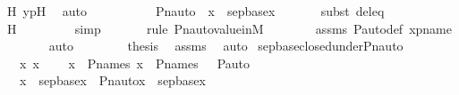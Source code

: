 \begin{isabellebody}
\ H\ ypH\ \isamarkupfalse%
\ auto\isanewline
\ \ \ \ \isamarkupfalse%
\isanewline
\isanewline
\ \ \ \ \isamarkupfalse%
\ {\isachardoublequoteopen}Pn{\isacharunderscore}{\kern0pt}auto{\isacharparenleft}{\kern0pt}{\isasympi}{\isacharparenright}{\kern0pt}\ {\isacharbackquote}{\kern0pt}\ x\ {\isasymin}\ sep{\isacharunderscore}{\kern0pt}base{\isacharparenleft}{\kern0pt}x{}{\isacharparenright}{\kern0pt}{\isachardoublequoteclose}\isanewline
\ \ \ \ \ \ \isamarkupfalse%
{\isacharparenleft}{\kern0pt}subst\ deleq{\isacharparenright}{\kern0pt}\isanewline
\ \ \ \ \ \ \isamarkupfalse%
\ H\ \isanewline
\ \ \ \ \ \ \isamarkupfalse%
\ simp\isanewline
\ \ \ \ \ \ \isamarkupfalse%
{\isacharparenleft}{\kern0pt}rule\ Pn{\isacharunderscore}{\kern0pt}auto{\isacharunderscore}{\kern0pt}value{\isacharunderscore}{\kern0pt}in{\isacharunderscore}{\kern0pt}M{\isacharparenright}{\kern0pt}\isanewline
\ \ \ \ \ \ \isamarkupfalse%
\ assms\ P{\isacharunderscore}{\kern0pt}auto{\isacharunderscore}{\kern0pt}def\ xpname\isanewline
\ \ \ \ \ \ \isamarkupfalse%
\ auto\isanewline
\ \ \isamarkupfalse%
\isanewline
\isanewline
\ \ \isamarkupfalse%
\ \isamarkupfalse%
\ {\isacharquery}{\kern0pt}thesis\ \isamarkupfalse%
\ assms\ \isamarkupfalse%
\ auto\isanewline
{}\isamarkupfalse%
%
\endisatagproof
{\isafoldproof}%
%
\isadelimproof
\isanewline
%
\endisadelimproof
\isanewline
{}\isamarkupfalse%
\ sep{\isacharunderscore}{\kern0pt}base{\isacharunderscore}{\kern0pt}closed{\isacharunderscore}{\kern0pt}under{\isacharunderscore}{\kern0pt}Pn{\isacharunderscore}{\kern0pt}auto{\isacharprime}{\kern0pt}\ {\isacharcolon}{\kern0pt}\ \isanewline
\ \ \ x\ x{}\ {\isasympi}\isanewline
\ \ \ {\isachardoublequoteopen}x\ {\isasymin}\ P{\isacharunderscore}{\kern0pt}names{\isachardoublequoteclose}\ {\isachardoublequoteopen}x{}\ {\isasymin}\ P{\isacharunderscore}{\kern0pt}names{\isachardoublequoteclose}\ {\isachardoublequoteopen}{\isasympi}\ {\isasymin}\ P{\isacharunderscore}{\kern0pt}auto{\isachardoublequoteclose}\ \isanewline
\ \ \ {\isachardoublequoteopen}x\ {\isasymin}\ sep{\isacharunderscore}{\kern0pt}base{\isacharparenleft}{\kern0pt}x{}{\isacharparenright}{\kern0pt}\ {\isasymlongleftrightarrow}\ Pn{\isacharunderscore}{\kern0pt}auto{\isacharparenleft}{\kern0pt}{\isasympi}{\isacharparenright}{\kern0pt}{\isacharbackquote}{\kern0pt}x\ {\isasymin}\ sep{\isacharunderscore}{\kern0pt}base{\isacharparenleft}{\kern0pt}x{}{\isacharparenright}{\kern0pt}{\isachardoublequoteclose}\ \isanewline

\end{isabellebody}
